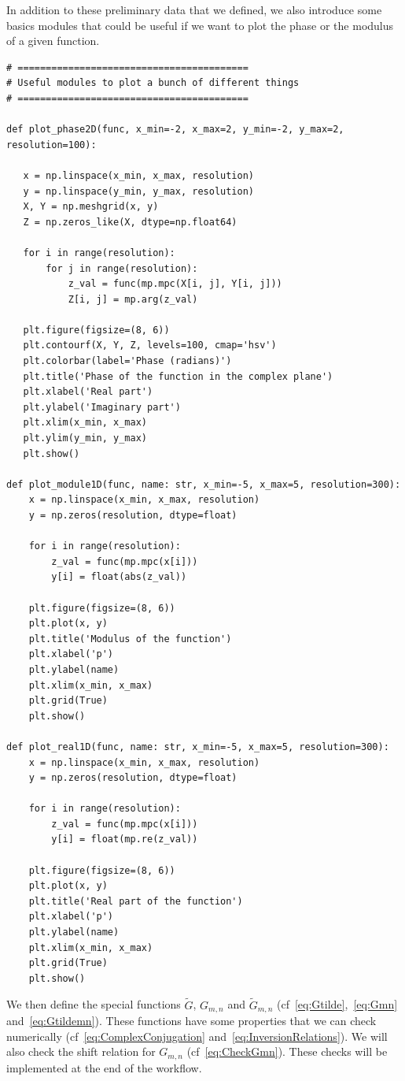 \documentclass[11pt]{article}
\begin{document}
In addition to these preliminary data that we defined, we also introduce some basics modules that could be useful if we want to plot the phase or the modulus of a given function.
\begin{lstlisting}
# =========================================
# Useful modules to plot a bunch of different things
# =========================================

def plot_phase2D(func, x_min=-2, x_max=2, y_min=-2, y_max=2, resolution=100):

   x = np.linspace(x_min, x_max, resolution)
   y = np.linspace(y_min, y_max, resolution)
   X, Y = np.meshgrid(x, y)
   Z = np.zeros_like(X, dtype=np.float64)

   for i in range(resolution):
       for j in range(resolution):
           z_val = func(mp.mpc(X[i, j], Y[i, j]))
           Z[i, j] = mp.arg(z_val)

   plt.figure(figsize=(8, 6))
   plt.contourf(X, Y, Z, levels=100, cmap='hsv')
   plt.colorbar(label='Phase (radians)')
   plt.title('Phase of the function in the complex plane')
   plt.xlabel('Real part')
   plt.ylabel('Imaginary part')
   plt.xlim(x_min, x_max)
   plt.ylim(y_min, y_max)
   plt.show()

def plot_module1D(func, name: str, x_min=-5, x_max=5, resolution=300):
    x = np.linspace(x_min, x_max, resolution)
    y = np.zeros(resolution, dtype=float)

    for i in range(resolution):
        z_val = func(mp.mpc(x[i]))
        y[i] = float(abs(z_val))

    plt.figure(figsize=(8, 6))
    plt.plot(x, y)
    plt.title('Modulus of the function')
    plt.xlabel('p')
    plt.ylabel(name)
    plt.xlim(x_min, x_max)
    plt.grid(True)
    plt.show()

def plot_real1D(func, name: str, x_min=-5, x_max=5, resolution=300):
    x = np.linspace(x_min, x_max, resolution)
    y = np.zeros(resolution, dtype=float)

    for i in range(resolution):
        z_val = func(mp.mpc(x[i]))
        y[i] = float(mp.re(z_val))

    plt.figure(figsize=(8, 6))
    plt.plot(x, y)
    plt.title('Real part of the function')
    plt.xlabel('p')
    plt.ylabel(name)
    plt.xlim(x_min, x_max)
    plt.grid(True)
    plt.show()
\end{lstlisting}
We then define the special functions $\tilde{G}$, $G_{m,n}$ and $\tilde{G}_{m,n}$ (cf~\eqref{eq:Gtilde},~\eqref{eq:Gmn} and~\eqref{eq:Gtildemn}). These functions have some properties that we can check numerically (cf~\eqref{eq:ComplexConjugation} and~\eqref{eq:InversionRelations}). We will also check the shift relation for $G_{m,n}$ (cf~\eqref{eq:CheckGmn}). These checks will be implemented at the end of the workflow.
\end{document}
